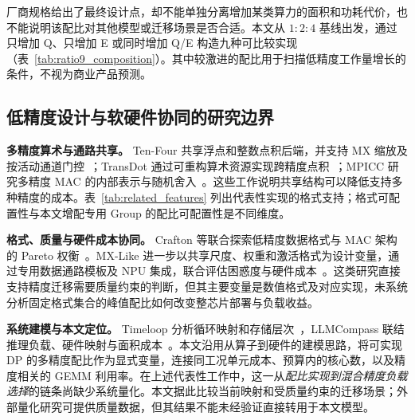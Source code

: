 厂商规格给出了最终设计点，却不能单独分离增加某类算力的面积和功耗代价，也不能说明该配比对其他模型或迁移场景是否合适。本文从 $1:2:4$ 基线出发，通过只增加 Q、只增加 E 或同时增加 Q/E 构造九种可比较实现（表~\ref{tab:ratio9_composition}）。其中较激进的配比用于扫描低精度工作量增长的条件，不视为商业产品预测。

\subsection{低精度设计与软硬件协同的研究边界}
\label{sec:datapath_sharing}

\textbf{多精度算术与通路共享。} Ten-Four 共享浮点和整数点积后端，并支持 MX 缩放及按活动通道门控~\cite{rout2026tenfourv3}；TransDot 通过可重构算术资源实现跨精度点积~\cite{transdot2026}；MPICC 研究多精度 MAC 的内部表示与随机舍入~\cite{huangMPICCMultiplePrecisionInterCombined2025}。这些工作说明共享结构可以降低支持多种精度的成本。表~\ref{tab:related_features} 列出代表性实现的格式支持；格式可配置性与本文增配专用 Group 的配比可配置性是不同维度。



\textbf{格式、质量与硬件成本协同。} Crafton 等联合探索低精度数据格式与 MAC 架构的 Pareto 权衡~\cite{paretomac2025}。MX-Like 进一步以共享尺度、权重和激活格式为设计变量，通过专用数据通路模板及 NPU 集成，联合评估困惑度与硬件成本~\cite{zhao2026mxlike}。这类研究直接支持精度迁移需要质量约束的判断，但其主要变量是数值格式及对应实现，未系统分析固定格式集合的峰值配比如何改变整芯片部署与负载收益。

\textbf{系统建模与本文定位。} Timeloop 分析循环映射和存储层次~\cite{timeloop2019}，LLMCompass 联结推理负载、硬件映射与面积成本~\cite{zhang2024llmcompass}。本文沿用从算子到硬件的建模思路，将可实现 DP 的多精度配比作为显式变量，连接同工况单元成本、预算内的核心数，以及精度相关的 GEMM 利用率。在上述代表性工作中，这一从\emph{配比实现到混合精度负载选择}的链条尚缺少系统量化。本文据此比较当前映射和受质量约束的迁移场景；外部量化研究可提供质量数据，但其结果不能未经验证直接转用于本文模型。
